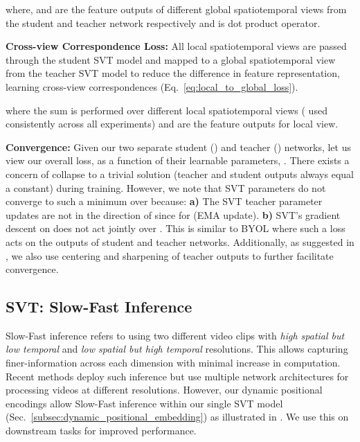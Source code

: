 \documentclass[10pt,twocolumn,letterpaper]{article}
\begin{document}
where,  and  are the feature outputs of different global spatiotemporal views from the student and teacher network respectively and  is dot product operator.

\vspace{0.1em}
\noindent\textbf{Cross-view Correspondence Loss:} 
All local spatiotemporal views are passed through the student SVT model and mapped to a global spatiotemporal view from the teacher SVT model to reduce the difference in feature representation, learning cross-view correspondences (Eq.~\ref{eq:local_to_global_loss}).

where the sum is performed over  different local spatiotemporal views ( used consistently across all experiments) and  are the feature outputs for  local view. 

\vspace{0.1em}
\noindent\textbf{Convergence:} 
Given our two separate student () and teacher () networks, let us view our overall loss,  as a function of their learnable parameters, . There exists a concern of collapse to a trivial solution (teacher and student outputs always equal a constant) during training. However, we note that SVT parameters do not converge to such a minimum over  because: \textbf{a)} The SVT teacher parameter updates are not in the direction of  since 
 for  (EMA update).
\textbf{b)} SVT's gradient descent on  does not act jointly over . 
This is similar to BYOL \cite{grill2020bootstrap} where such a loss acts on the outputs of student and teacher networks. Additionally, as suggested in \cite{caron2021emerging}, we also use centering and sharpening of teacher outputs to further facilitate convergence. 

\vspace{0.5em}
\subsection{SVT: Slow-Fast Inference}
\label{subsec:sf_inf}
Slow-Fast inference refers to using two different video clips with \textit{high spatial but low temporal} and \textit{low spatial but high temporal} resolutions. This allows capturing finer-information across each dimension with minimal increase in computation. Recent methods \cite{feichtenhofer2019slowfast, kahatapitiya2021coarse} deploy such inference but use multiple network architectures for processing videos at different resolutions. However, our dynamic positional encodings allow Slow-Fast inference within our single SVT model (Sec.~\ref{subsec:dynamic_positional_embedding}) as illustrated in . We use this on downstream tasks for improved performance.
\end{document}
